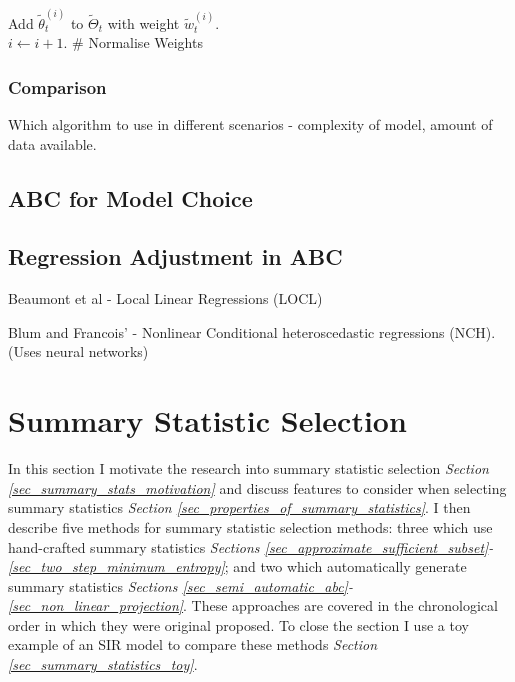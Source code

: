 \documentclass[bibliography=totoc,11pt,a4paper,margin=0]{article}
\theoremstyle{break}
\begin{document}
\begin{box_algorithm}
\begin{algorithm}[H]
{{{            Add $\tilde\theta_t^{(i)}$ to $\tilde\Theta_t$ with weight $\tilde{w}_t^{(i)}$.\\
            $i\leftarrow i+1$.
          }
        }
        \BlankLine
        \# Normalise Weights\\
      }
    \end{algorithm}
  \end{box_algorithm}

\subsubsection{Comparison}\label{sec_abc_comparison}

  Which algorithm to use in different scenarios - complexity of model, amount of data available.

\subsection{ABC for Model Choice}\label{sec_abc_model_choice}

\subsection{Regression Adjustment in ABC}\label{abc_regression_adjustment}

  \par Beaumont et al - Local Linear Regressions (LOCL)
  \par Blum and Francois' - Nonlinear Conditional heteroscedastic regressions (NCH). (Uses neural networks)

\newpage
\section{Summary Statistic Selection}\label{sec_summary_stats}


  In this section I motivate the research into summary statistic selection \textit{Section \ref{sec_summary_stats_motivation}} and discuss features to consider when selecting summary statistics \textit{Section \ref{sec_properties_of_summary_statistics}}. I then describe five methods for summary statistic selection methods: three which use hand-crafted summary statistics \textit{Sections \ref{sec_approximate_sufficient_subset}-\ref{sec_two_step_minimum_entropy}}; and two which automatically generate summary statistics \textit{Sections \ref{sec_semi_automatic_abc}-\ref{sec_non_linear_projection}}. These approaches are covered in the chronological order in which they were original proposed. To close the section I use a toy example of an SIR model to compare these methods \textit{Section \ref{sec_summary_statistics_toy}}.
\end{document}
